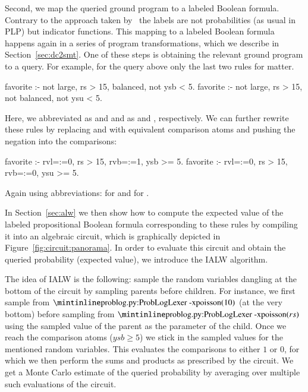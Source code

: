 Second, we map the queried ground program to a labeled Boolean formula. Contrary to the approach taken by~\citet{fierens2015inference} the labels are not probabilities (as usual in PLP) but indicator functions. This mapping to a labeled Boolean formula happens again in a series of program transformations, which we describe in Section~\ref{sec:dc2smt}. One of these steps is obtaining the relevant ground program to a query. For example, for the query above 
only the last two rules for   matter.
\begin{problog*}{}
favorite :- not large, rs > 15, balanced, not ysb < 5.
favorite :- not large, rs > 15, not balanced, not ysu < 5.
\end{problog*}
Here, we abbreviated  as  and  and  as  and , respectively. We can further rewrite these rules by replacing  and  with equivalent comparison atoms and pushing the negation into the comparisons:
\begin{problog*}{}
favorite :- rvl=:=0, rs > 15, rvb=:=1, ysb >= 5.
favorite :- rvl=:=0, rs > 15, rvb=:=0, ysu >= 5.
\end{problog*}
Again using abbreviations:  for  and  for .

In Section~\ref{sec:alw} we then show how to compute the expected value of the labeled propositional Boolean formula corresponding to these rules by compiling it into an algebraic circuit, which is graphically depicted in Figure~\ref{fig:circuit:panorama}. In order to evaluate this circuit and obtain the queried probability (expected value), we introduce the IALW algorithm.

The idea of IALW is the following: sample the random variables dangling at the bottom of the circuit by sampling parents before children. For instance, we first sample from $\mathprobloginline{poisson}(10)$ (at the very bottom) before sampling from $\mathprobloginline{poisson}(rs)$ using the sampled value of the parent as the parameter of the child. Once we reach the comparison atoms (\eg $ysb\geq5$) we stick in the sampled values for the mentioned random variables. This evaluates the comparisons to either $1$ or $0$, for which we then perform the sums and products as prescribed by the circuit. We get a Monte Carlo estimate of the queried probability by averaging over multiple such evaluations of the circuit.


